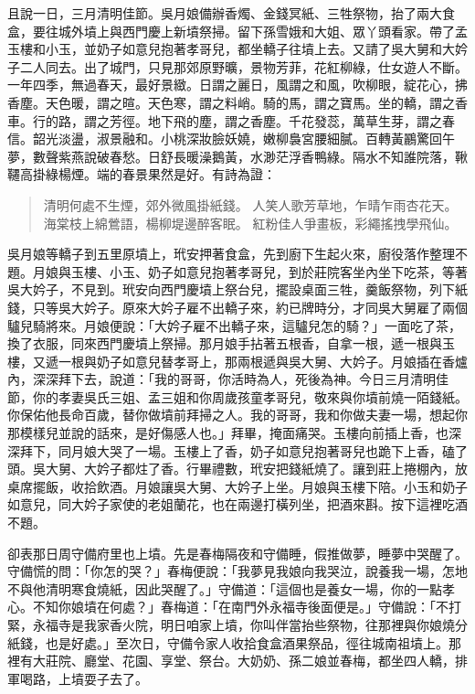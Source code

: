 且說一日，三月清明佳節。吳月娘備辦香燭、金錢冥紙、三牲祭物，抬了兩大食盒，要往城外墳上與西門慶上新墳祭掃。留下孫雪娥和大姐、眾丫頭看家。帶了孟玉樓和小玉，並奶子如意兒抱著孝哥兒，都坐轎子往墳上去。又請了吳大舅和大妗子二人同去。出了城門，只見那郊原野曠，景物芳菲，花紅柳綠，仕女遊人不斷。一年四季，無過春天，最好景緻。日謂之麗日，風謂之和風，吹柳眼，綻花心，拂香塵。天色暖，謂之暄。天色寒，謂之料峭。騎的馬，謂之寶馬。坐的轎，謂之香車。行的路，謂之芳徑。地下飛的塵，謂之香塵。千花發蕊，萬草生芽，謂之春信。韶光淡盪，淑景融和。小桃深妝臉妖嬈，嫩柳裊宮腰細膩。百轉黃鸝驚回午夢，數聲紫燕說破春愁。日舒長暖澡鵝黃，水渺茫浮香鴨綠。隔水不知誰院落，鞦韆高掛綠楊煙。端的春景果然是好。有詩為證：
\begin{quote}
清明何處不生煙，郊外微風掛紙錢。
人笑人歌芳草地，乍晴乍雨杏花天。
海棠枝上綿鶯語，楊柳堤邊醉客眠。
紅粉佳人爭畫板，彩繩搖拽學飛仙。
\end{quote}

吳月娘等轎子到五里原墳上，玳安押著食盒，先到廚下生起火來，廚役落作整理不題。月娘與玉樓、小玉、奶子如意兒抱著孝哥兒，到於莊院客坐內坐下吃茶，等著吳大妗子，不見到。玳安向西門慶墳上祭台兒，擺設桌面三牲，羹飯祭物，列下紙錢，只等吳大妗子。原來大妗子雇不出轎子來，約已牌時分，才同吳大舅雇了兩個驢兒騎將來。月娘便說：「大妗子雇不出轎子來，這驢兒怎的騎？」一面吃了茶，換了衣服，同來西門慶墳上祭掃。那月娘手拈著五根香，自拿一根，遞一根與玉樓，又遞一根與奶子如意兒替孝哥上，那兩根遞與吳大舅、大妗子。月娘插在香爐內，深深拜下去，說道：「我的哥哥，你活時為人，死後為神。今日三月清明佳節，你的孝妻吳氏三姐、孟三姐和你周歲孩童孝哥兒，敬來與你墳前燒一陌錢紙。你保佑他長命百歲，替你做墳前拜掃之人。我的哥哥，我和你做夫妻一場，想起你那模樣兒並說的話來，是好傷感人也。」拜畢，掩面痛哭。玉樓向前插上香，也深深拜下，同月娘大哭了一場。玉樓上了香，奶子如意兒抱著哥兒也跪下上香，磕了頭。吳大舅、大妗子都炷了香。行畢禮數，玳安把錢紙燒了。讓到莊上捲棚內，放桌席擺飯，收拾飲酒。月娘讓吳大舅、大妗子上坐。月娘與玉樓下陪。小玉和奶子如意兒，同大妗子家使的老姐蘭花，也在兩邊打橫列坐，把酒來斟。按下這裡吃酒不題。

卻表那日周守備府里也上墳。先是春梅隔夜和守備睡，假推做夢，睡夢中哭醒了。守備慌的問：「你怎的哭？」春梅便說：「我夢見我娘向我哭泣，說養我一場，怎地不與他清明寒食燒紙，因此哭醒了。」守備道：「這個也是養女一場，你的一點孝心。不知你娘墳在何處？」春梅道：「在南門外永福寺後面便是。」守備說：「不打緊，永福寺是我家香火院，明日咱家上墳，你叫伴當抬些祭物，往那裡與你娘燒分紙錢，也是好處。」至次日，守備令家人收拾食盒酒果祭品，徑往城南祖墳上。那裡有大莊院、廳堂、花園、享堂、祭台。大奶奶、孫二娘並春梅，都坐四人轎，排軍喝路，上墳耍子去了。

